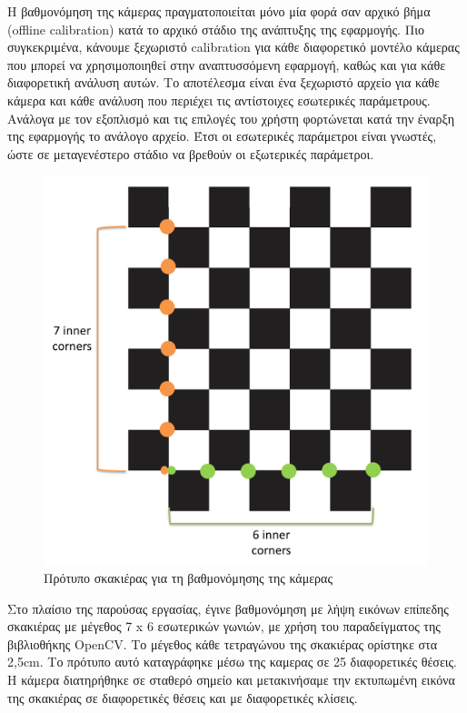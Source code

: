 Η βαθμονόμηση της κάμερας πραγματοποιείται μόνο μία φορά σαν αρχικό βήμα (offline calibration) κατά το αρχικό στάδιο της ανάπτυξης της εφαρμογής. Πιο συγκεκριμένα, κάνουμε ξεχωριστό calibration για κάθε διαφορετικό μοντέλο κάμερας που μπορεί να χρησιμοποιηθεί στην αναπτυσσόμενη εφαρμογή, καθώς και για κάθε διαφορετική ανάλυση αυτών. Το αποτέλεσμα είναι ένα ξεχωριστό αρχείο για κάθε κάμερα και κάθε ανάλυση που περιέχει τις αντίστοιχες εσωτερικές παράμετρους. Ανάλογα με τον εξοπλισμό και τις επιλογές του χρήστη φορτώνεται κατά την έναρξη της εφαρμογής το ανάλογο αρχείο. Έτσι οι εσωτερικές παράμετροι είναι γνωστές, ώστε σε μεταγενέστερο στάδιο να βρεθούν οι εξωτερικές παράμετροι.



\begin{figure}[H]
    \centering
    \includegraphics[scale=0.6, angle=0]{Files/Figures/pattern.png}
    \caption[Πρότυπο σκακιέρας για τη βαθμονόμησης της κάμερας]{Πρότυπο σκακιέρας για τη βαθμονόμησης της κάμερας}
    \label{fig:pattern}
\end{figure}






Στο πλαίσιο της παρούσας εργασίας, έγινε βαθμονόμηση με λήψη εικόνων επίπεδης σκακιέρας με μέγεθος 7 x 6 εσωτερικών γωνιών, με χρήση του παραδείγματος της βιβλιοθήκης OpenCV. Το μέγεθος κάθε τετραγώνου της σκακιέρας ορίστηκε στα 2,5cm. Το πρότυπο αυτό καταγράφηκε μέσω της καμερας σε 25 διαφορετικές θέσεις. Η κάμερα διατηρήθηκε σε σταθερό σημείο και μετακινήσαμε την εκτυπωμένη εικόνα της σκακιέρας σε διαφορετικές θέσεις και με διαφορετικές κλίσεις. 



